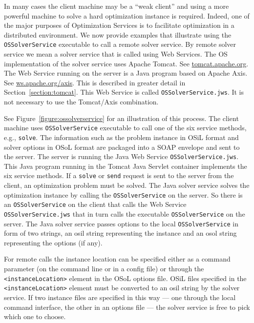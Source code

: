 In many cases the client machine may be a ``weak client'' and  using a more powerful machine to solve a
hard optimization instance is required. Indeed, one of the major purposes of Optimization Services is to
facilitate optimization in a distributed environment.   We now provide examples that illustrate using the
{\tt OSSolverService} executable to call a remote solver service.   By remote solver service we mean a
solver service that is called using Web Services.  The OS implementation  of the solver service
uses Apache Tomcat. See \url{tomcat.apache.org}. The Web Service running on the server
is a Java program based on Apache Axis. See \url{ws.apache.org/axis}. This is described
in greater detail in Section~\ref{section:tomcat}.
This Web Service is called {\tt OSSolverService.jws}.
It is not necessary to use the Tomcat/Axis combination.



See Figure~\ref{figure:ossolverservice} for an illustration of this process.
The client machine uses {\tt OSSolverService} executable to call one of the
six service methods, e.g., {\tt solve}. 
The  information such as the problem
instance in OSiL format and solver options in OSoL format are packaged into
a SOAP envelope and sent to the server. The server is running the Java Web
Service {\tt OSSolverService.jws}. This Java program running in the Tomcat
Java Servlet container implements the six service methods. If a {\tt solve}
or {\tt send} request is sent to the server from the client, an optimization
problem must be solved. The Java solver service solves the optimization instance
by  calling the  {\tt OSSolverService} on the server. So there is an {\tt OSSolverService}
on the client that calls the Web Service {\tt  OSSolverService.jws} that in turn
calls  the executable {\tt OSSolverService} on the server.
The Java solver service passes options to the local {\tt OSSolverService}
in form of two strings, an osil string representing the instance and an osol string
representing the options (if any). 


For remote calls the instance location can be specified either as a command parameter 
(on the command line or in a config file)
or through the {\tt <instanceLocation>} element in the OSoL options file.
OSiL files specified in the {\tt <instanceLocation>} element must be converted to an osil string
by the solver service.
If two instance files
are specified in this way --- one through the local command interface, the other in an options file --- 
the solver service is free to pick which one to choose.





